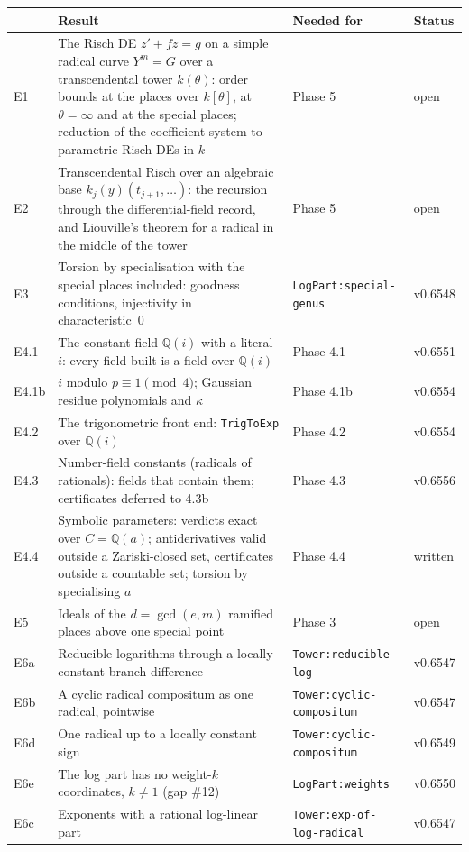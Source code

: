 \documentclass[11pt]{article}
\theoremstyle{definition}
\theoremstyle{remark}
\newcommand{\Q}{\mathbb{Q}}
\newcommand{\code}[1]{\texttt{#1}}
\begin{document}
\begin{longtable}{lp{}p{}l}
\toprule
& Result & Needed for & Status \\ \midrule
E1 & The Risch DE $z'+fz=g$ on a simple radical curve $Y^m=G$ over a
  transcendental tower $k(\theta)$: order bounds at the places over $k[\theta]$,
  at $\theta=\infty$ and at the special places; reduction of the coefficient
  system to parametric Risch DEs in $k$ & Phase 5 & open \\
E2 & Transcendental Risch over an algebraic base $k_j(y)(t_{j+1},\dots)$: the
  recursion through the differential-field record, and Liouville's theorem for a
  radical in the middle of the tower & Phase 5 & open \\
E3 & Torsion by specialisation with the special places included: goodness
  conditions, injectivity in characteristic~0 & \code{LogPart:special-genus} & v0.6548 \\
E4.1 & The constant field $\Q(i)$ with a literal $i$: every field built is a
  field over $\Q(i)$ & Phase 4.1 & v0.6551 \\
E4.1b & $i$ modulo $p\equiv1\pmod4$; Gaussian residue polynomials and $\kappa$ &
  Phase 4.1b & v0.6554 \\
E4.2 & The trigonometric front end: \code{TrigToExp} over $\Q(i)$ & Phase 4.2 & v0.6554 \\
E4.3 & Number-field constants (radicals of rationals): fields that contain them;
  certificates deferred to 4.3b & Phase 4.3 & v0.6556 \\
E4.4 & Symbolic parameters: verdicts exact over $C=\Q(a)$; antiderivatives valid outside a
  Zariski-closed set, certificates outside a countable set; torsion by specialising $a$ &
  Phase 4.4 & written \\
E5 & Ideals of the $d=\gcd(e,m)$ ramified places above one special point &
  Phase 3 & open \\
E6a & Reducible logarithms through a locally constant branch difference &
  \code{Tower:reducible-log} & v0.6547 \\
E6b & A cyclic radical compositum as one radical, pointwise &
  \code{Tower:cyclic-compositum} & v0.6547 \\
E6d & One radical up to a locally constant sign &
  \code{Tower:cyclic-compositum} & v0.6549 \\
E6e & The log part has no weight-$k$ coordinates, $k\ne1$ (gap \#12) &
  \code{LogPart:weights} & v0.6550 \\
E6c & Exponents with a rational log-linear part &
  \code{Tower:exp-of-log-radical} & v0.6547 \\
\bottomrule
\end{longtable}
\end{document}
